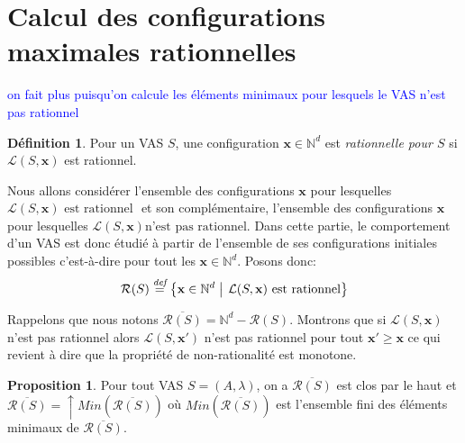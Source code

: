 \documentclass[a4paper,final]{article}
\theoremstyle{definition}
\newtheorem{Definition}[Theorem]{Définition}
\newtheorem{Proposition}[Theorem]{Proposition}
\let\geq\geqslant
\newcommand{\alain}[1]{\textcolor{blue}{#1}}
\newcommand{\lucas}[1]{\textcolor{olive}{#1}}
\newcommand{\set}[2]{\left\{#1\mathrel{\left|\vphantom{#1}\vphantom{#2}\right.}#2\right\}}
\newcommand{\defeq}{\ensuremath{\stackrel{\textit{def}}{=}}}
\newcommand{\Min}{\textit{Min}}
\newcommand{\N}{\ensuremath{\mathbb{N}}}
\newcommand{\lang}{\ensuremath{\mathcal{L}}}
\newcommand{\vect}[1]{\ensuremath{\mathbf{#1}}}
\newcommand{\inirat}{\mathcal{R}}
\begin{document}

\section{Calcul des configurations maximales rationnelles}
\alain{on fait plus puisqu'on calcule les éléments minimaux pour lesquels le VAS n'est pas rationnel}

\begin{Definition}
Pour un VAS $S$, une configuration $\vect{x} \in \N^d$ est \emph{rationnelle pour $S$} si $\lang(S,\vect{x})$ est rationnel.
\end{Definition}

Nous allons considérer l'ensemble des configurations $\vect{x}$ pour lesquelles ${\lang(S,\vect{x}) \text{ est rationnel }}$ et son complémentaire, l'ensemble des configurations $\vect{x}$ pour lesquelles ${\lang(S,\vect{x}) \text{n'est pas rationnel}}$. 
%
	Dans cette partie, le comportement d'un VAS est donc étudié à partir de l'ensemble de ses configurations initiales possibles c'est-à-dire pour tout les $\vect{x} \in \N^d$.
%
Posons donc: $$\inirat(S) \defeq \set{\vect{x} \in \N^d} {\lang(S,\vect{x}) \text{ est rationnel}}$$

\noindent
Rappelons que nous notons $\overline{\inirat(S)}
    = \N^d - \inirat(S)$.
%
Montrons que si $\lang(S,\vect{x})$ n'est pas rationnel alors $\lang(S,\vect{x'})$ n'est pas rationnel pour tout $\vect{x'} \geq \vect{x}$ ce qui revient à dire que la propriété de non-rationalité est monotone.

\begin{Proposition}\label{monotonie_rationnel}
Pour tout VAS $S = (A,\lambda)$, on a $\overline{\inirat(S)}$ est clos par le haut et $\overline{\inirat(S)} = \uparrow \Min(\overline{\inirat(S)})$ où $\Min(\overline{\inirat(S)})$ est l'ensemble fini des éléments minimaux de $\overline{\inirat(S)}$.
\end{Proposition}

\end{document}
